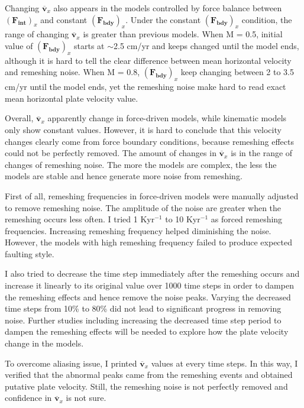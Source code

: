 \documentclass[letterpaper,12pt,notitle]{memphisthesis}                     %
\begin{document}
Changing $\overline{\boldsymbol{v}}_{x}$ also appears in the models controlled by force balance between $(\boldsymbol{F_{int}})_x$ and constant $(\boldsymbol{F_{bdy}})_x$. Under the constant $(\boldsymbol{F_{bdy}})_x$ condition, the range of changing $\overline{\boldsymbol{v}}_{x}$ is greater than previous models. When M = 0.5, initial value of $(\boldsymbol{F_{bdy}})_x$ starts at $\sim$2.5 cm/yr and keeps changed until the model ends, although it is hard to tell the clear difference between mean horizontal velocity and remeshing noise. When M = 0.8, $(\boldsymbol{F_{bdy}})_x$ keep changing between 2 to 3.5 cm/yr until the model ends, yet the remeshing noise make hard to read exact mean horizontal plate velocity value.

Overall, $\overline{\boldsymbol{v}}_{x}$ apparently change in force-driven models, while kinematic models only show constant values. However, it is hard to conclude that this velocity changes clearly come from force boundary conditions, because remeshing effects could not be perfectly removed. The amount of changes in $\overline{\boldsymbol{v}}_{x}$ is in the range of changes of remeshing noise. The more the models are complex, the less the models are stable and hence generate more noise from remeshing.

First of all, remeshing frequencies in force-driven models were manually adjusted to remove remeshing noise. The amplitude of the noise %
are greater when the remeshing occurs less often. I tried 1 Kyr$^{-1}$ to 10 Kyr$^{-1}$ as forced remeshing frequencies. Increasing remeshing frequency helped diminishing the noise. However, the models with high remeshing frequency failed to produce expected faulting style.

I also tried to decrease the time step immediately after the remeshing occurs and increase it linearly to its original value over 1000 time steps in order to dampen the remeshing effects and hence remove the noise peaks. Varying the decreased time steps from 10\% to 80\% did not lead to significant progress in removing noise. Further studies including increasing the decreased time step period to dampen the remeshing effects will be needed to explore how the plate velocity change in the models. 

To overcome aliasing issue, I printed $\overline{\boldsymbol{v}}_{x}$ values at every time steps. In this way, I verified that the abnormal peaks came from the remeshing events and obtained putative plate velocity. Still, the remeshing noise is not perfectly removed and confidence in $\overline{\boldsymbol{v}}_{x}$ is not sure.
\end{document}
